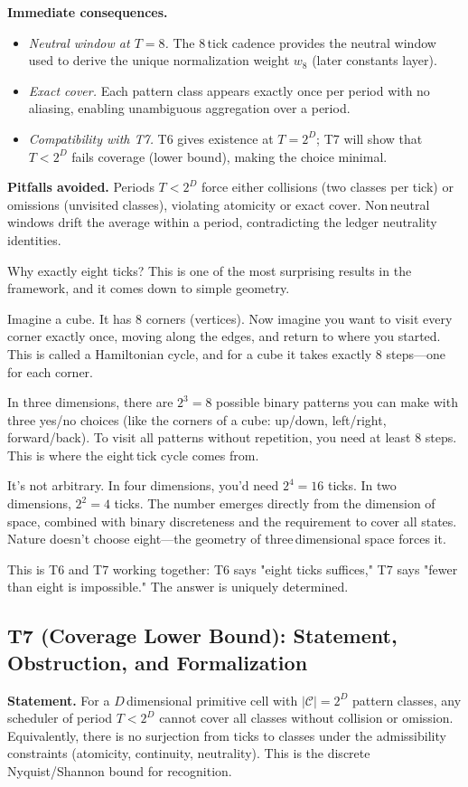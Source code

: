 \documentclass[11pt]{article}
\begin{document}
\textbf{Immediate consequences.}
\begin{itemize}[leftmargin=*]
  \item \emph{Neutral window at $T=8$.} The $8$\,tick cadence provides the neutral window used to derive the unique normalization weight $w_8$ (later constants layer).
  \item \emph{Exact cover.} Each pattern class appears exactly once per period with no aliasing, enabling unambiguous aggregation over a period.
  \item \emph{Compatibility with T7.} T6 gives existence at $T=2^D$; T7 will show that $T<2^D$ fails coverage (lower bound), making the choice minimal.
\end{itemize}

\textbf{Pitfalls avoided.} Periods $T<2^D$ force either collisions (two classes per tick) or omissions (unvisited classes), violating atomicity or exact cover. Non\,neutral windows drift the average within a period, contradicting the ledger neutrality identities.

\begin{explanationbox}
Why exactly eight ticks? This is one of the most surprising results in the framework, and it comes down to simple geometry.

Imagine a cube. It has 8 corners (vertices). Now imagine you want to visit every corner exactly once, moving along the edges, and return to where you started. This is called a Hamiltonian cycle, and for a cube it takes exactly 8 steps—one for each corner.

In three dimensions, there are $2^3=8$ possible binary patterns you can make with three yes/no choices (like the corners of a cube: up/down, left/right, forward/back). To visit all patterns without repetition, you need at least 8 steps. This is where the eight\,tick cycle comes from.

It's not arbitrary. In four dimensions, you'd need $2^4=16$ ticks. In two dimensions, $2^2=4$ ticks. The number emerges directly from the dimension of space, combined with binary discreteness and the requirement to cover all states. Nature doesn't choose eight—the geometry of three\,dimensional space forces it.

This is T6 and T7 working together: T6 says "eight ticks suffices," T7 says "fewer than eight is impossible." The answer is uniquely determined.
\end{explanationbox}

\subsection*{T7 (Coverage Lower Bound): Statement, Obstruction, and Formalization}
\textbf{Statement.} For a $D$\,dimensional primitive cell with $|\mathcal C|=2^D$ pattern classes, any scheduler of period $T<2^D$ cannot cover all classes without collision or omission. Equivalently, there is no surjection from ticks to classes under the admissibility constraints (atomicity, continuity, neutrality). This is the discrete Nyquist/Shannon bound for recognition.
\end{document}
